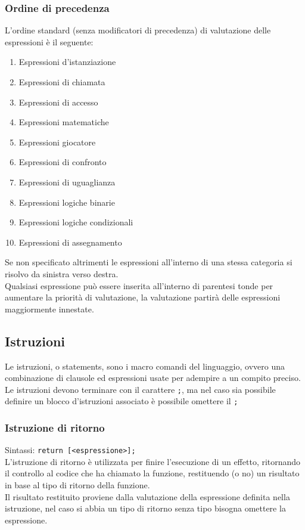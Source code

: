 \subsubsection{Ordine di precedenza}
L'ordine standard (senza modificatori di precedenza) di valutazione delle espressioni è il seguente:
\begin{enumerate}
    \item Espressioni d'istanziazione
    \item Espressioni di chiamata
    \item Espressioni di accesso
    \item Espressioni matematiche
    \item Espressioni giocatore
    \item Espressioni di confronto
    \item Espressioni di uguaglianza 
    \item Espressioni logiche binarie 
    \item Espressioni logiche condizionali 
    \item Espressioni di assegnamento
\end{enumerate}
Se non specificato altrimenti le espressioni all'interno di una stessa categoria 
si risolvo da sinistra verso destra. \\
Qualsiasi espressione può essere inserita all'interno di parentesi tonde per aumentare 
la priorità di valutazione, la valutazione partirà delle espressioni maggiormente innestate.

\newpage
\subsection{Istruzioni}
Le istruzioni, o statements, sono i macro comandi del linguaggio, ovvero una combinazione 
di clausole ed espressioni usate per adempire a un compito preciso.
Le istruzioni devono terminare con il carattere \verb|;|, ma nel caso sia possibile definire
un blocco d'istruzioni associato è possibile omettere il \verb|;|

\subsubsection{Istruzione di ritorno}
Sintassi:   \verb|return [<espressione>];| \\
L’istruzione di ritorno è utilizzata per finire l’esecuzione di un effetto,
ritornando il controllo al codice che ha chiamato la funzione,
restituendo (o no) un risultato in base al tipo di ritorno della funzione. \\
Il risultato restituito proviene dalla valutazione della espressione definita nella istruzione,
nel caso si abbia un tipo di ritorno senza tipo bisogna omettere la espressione.

